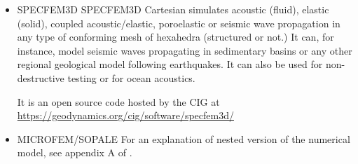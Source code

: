 \begin{itemize}
\item {\codefont SPECFEM3D} 
SPECFEM3D Cartesian simulates acoustic (fluid), elastic (solid), coupled acoustic/elastic, 
poroelastic or seismic wave propagation in any type of conforming mesh of hexahedra 
(structured or not.) It can, for instance, model seismic waves propagating in sedimentary 
basins or any other regional geological model following earthquakes. It can also be used 
for non-destructive testing or for ocean acoustics. 

It is an open source code hosted by the CIG at 
\url{https://geodynamics.org/cig/software/specfem3d/}

{\small
\noindent
\cite{kott05}
}

\item {\codefont MICROFEM}/{\codefont SOPALE} 
For an explanation of nested version of the numerical model, see appendix A of \cite{webe18}.


\end{itemize}
